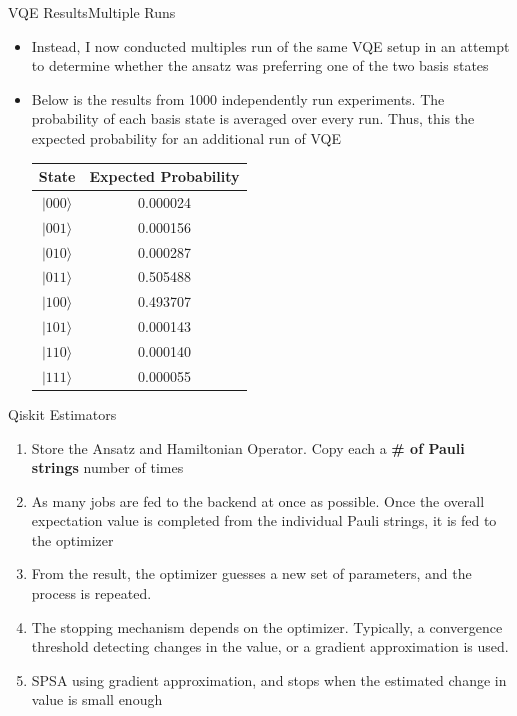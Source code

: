 \begin{frame}{VQE Results}{Multiple Runs}
    \begin{itemize}
        \item Instead, I now conducted multiples run of the same VQE setup in an attempt to determine whether the ansatz was preferring one of the two basis states
        \item Below is the results from 1000 independently run experiments. The probability of each basis state is averaged over every run. Thus, this the expected probability for an additional run of VQE

        \begin{center}
            \begin{tabular}{c|c}
               State  & Expected Probability \\
               \hline
                $|000\rangle$ & 0.000024 \\
                $|001\rangle$ & 0.000156 \\
                $|010\rangle$ & 0.000287 \\
                $|011\rangle$ & 0.505488 \\
                $|100\rangle$ & 0.493707 \\
                $|101\rangle$ & 0.000143 \\
                $|110\rangle$ & 0.000140 \\
                $|111\rangle$ & 0.000055 \\
            \end{tabular}
        \end{center}
        
    \end{itemize}
\end{frame}


\begin{frame}{Qiskit Estimators}
    \begin{enumerate}
        \item Store the Ansatz and Hamiltonian Operator. Copy each a \textbf{\# of Pauli strings} number of times
        \item As many jobs are fed to the backend at once as possible. Once the overall expectation value is completed from the individual Pauli strings, it is fed to the optimizer
        \item From the result, the optimizer guesses a new set of parameters, and the process is repeated.
        \item The stopping mechanism depends on the optimizer. Typically, a convergence threshold detecting changes in the value, or a gradient approximation is used.
        \item SPSA using gradient approximation, and stops when the estimated change in value is small enough
    \end{enumerate}
\end{frame}


